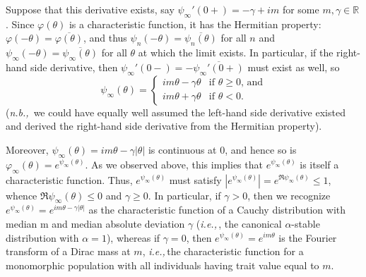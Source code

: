 \documentclass{article}
\newcommand{\E}{\mathbb{E}}
\newcommand{\ie}{\textit{i.e.,}\,}
\newcommand{\nb}{\textit{n.b.,}\, }
\newcommand{\1}{\mathbbm{1}}
\DeclareMathOperator*{\re}{Re}
\theoremstyle{remark}
\theoremstyle{definition}
\begin{document}
Suppose that this derivative exists, say $\psi_{\infty}'(0+) = -\gamma + i m$ for some $m, \gamma \in \mathbb{R}$.  Since $\varphi(\theta)$ is a characteristic function, it has the Hermitian property: $\varphi(-\theta) = \overline{\varphi(\theta)}$, and thus $\psi_{n}(-\theta) = \overline{\psi_{n}(\theta)}$ for all $n$ and $\psi_{\infty}(-\theta) = \overline{\psi_{\infty}(\theta)}$ for all $\theta$ at which the limit exists.    In particular, if the right-hand side derivative, then $\psi_{\infty}'(0-) = -\overline{\psi_{\infty}'(0+)}$ must exist as well, so
\[
	\psi_{\infty}(\theta) = \begin{cases} 
		i m\theta - \gamma \theta & \text{if $\theta \geq 0$, and}\\
		i m\theta + \gamma \theta & \text{if $\theta < 0$}.
	\end{cases}
\]
(\nb we could have equally well assumed the left-hand side derivative existed and derived the right-hand side derivative from the Hermitian property).  

Moreover,  $\psi_{\infty}(\theta) = i m \theta - \gamma |\theta|$ is continuous at 0, and hence so is $\varphi_{\infty}(\theta) = e^{\psi_{\infty}(\theta)}$.  As we observed above, this implies that $e^{\psi_{\infty}(\theta)}$ is itself a characteristic function.  Thus, $e^{\psi_{\infty}(\theta)}$ must satisfy $|e^{\psi_{\infty}(\theta)}| = e^{\Re \psi_{\infty}(\theta)} \leq 1$, whence $\Re \psi_{\infty}(\theta) \leq 0$ and $\gamma \geq 0$.  In particular, if $\gamma > 0$, then we recognize $e^{\psi_{\infty}(\theta)} = e^{im \theta -\gamma|\theta|}$ as the characteristic function of a Cauchy distribution with median m and median absolute deviation $\gamma$ (\ie, the canonical $\alpha$-stable distribution with $\alpha=1$),  whereas if $\gamma = 0$, then $e^{\psi_{\infty}(\theta)} = e^{im \theta}$ is the Fourier transform of a Dirac mass at $m$, \ie the characteristic function for a monomorphic population with all individuals having trait value equal to $m$.


\end{document}
